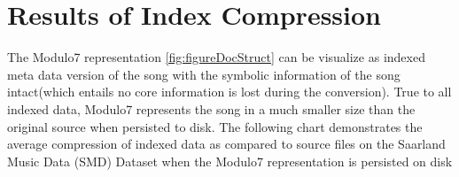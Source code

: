 \section{Results of Index Compression} \label{indexcompression}

\noindent The Modulo7 representation \ref{fig:figureDocStruct} can be visualize as indexed meta data version of the song with the symbolic information of the song intact(which entails no core information is lost during the conversion). True to all indexed data, Modulo7 represents the song in a much smaller size than the original source when persisted to disk. The following chart demonstrates the average compression of indexed data as compared to source files on the Saarland Music Data (SMD) Dataset \cite{saarlandmsd} when the Modulo7 representation is persisted on disk 

